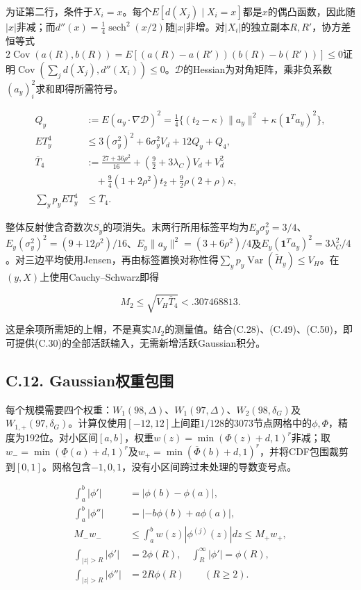 \documentclass[11pt,a4paper]{article}
\begin{document}
为证第二行，条件于\(X_i=x\)。每个\(E[d(X_j)\mid X_i=x]\)都是\(x\)的偶凸函数，因此随\(|x|\)非减；而\(d''(x)=\tfrac14\operatorname{sech}^2(x/2)\)随\(|x|\)非增。对\(|X_i|\)的独立副本\(R,R'\)，协方差恒等式\(2\operatorname{Cov}(a(R),b(R))=E[(a(R)-a(R'))(b(R)-b(R'))]\le0\)证明\(\operatorname{Cov}(\sum_jd(X_j),d''(X_i))\le0\)。\(\mathcal D\)的Hessian为对角矩阵，乘非负系数\((a_y)_i^2\)求和即得所需符号。

\[
\begin{aligned}
Q_y&:=E(a_y\cdot\nabla\mathcal D)^2
=\tfrac14\{(t_2-\kappa)\|a_y\|^2+\kappa(\mathbf1^Ta_y)^2\},\\
ET_y^4&\le3(\sigma_y^2)^2+6\sigma_y^2V_d+12Q_y+Q_4,\\
\overline T_4&:=\frac{27+36\rho^2}{16}
+\left(\frac92+3\lambda_C\right)V_d+V_d^2\\
&\quad+\frac94(1+2\rho^2)t_2+\frac92\rho(2+\rho)\kappa,\\
\sum_yp_yET_y^4&\le\overline T_4.
\end{aligned}
\tag{C.53}
\]

整体反射使含奇数次\(S_y\)的项消失。末两行所用标签平均为\(E_y\sigma_y^2=3/4\)、\(E_y(\sigma_y^2)^2=(9+12\rho^2)/16\)、\(E_y\|a_y\|^2=(3+6\rho^2)/4\)及\(E_y(\mathbf1^Ta_y)^2=3\lambda_C^2/4\)。对三边平均使用Jensen，再由标签置换对称性得\(\sum_yp_y\operatorname{Var}(\widetilde H_y)\le V_H\)。在\((y,X)\)上使用Cauchy--Schwarz即得

\[
M_2\le\sqrt{V_H\overline T_4}<.307468813.
\tag{C.54}
\]

这是余项所需矩的上帽，不是真实\(M_2\)的测量值。结合(C.28)、(C.49)、(C.50)，即可提供(C.30)的全部活跃输入，无需新增活跃Gaussian积分。

\subsection*{C.12.
Gaussian权重包围}\label{c.12.-gaussianux6743ux91cdux5305ux56f4}

每个规模需要四个权重：\(W_1(98,\Delta)\)、\(W_1(97,\Delta)\)、\(W_2(98,\delta_G)\)及\(W_{1,+}(97,\delta_G)\)。计算仅使用\([-12,12]\)上间距\(1/128\)的3073节点网格中的\(\phi,\Phi\)，精度为192位。对小区间\([a,b]\)，权重\(w(z)=\min(\Phi(z)+d,1)^r\)非减；取\(w_- =\min(\underline\Phi(a)+d,1)^r\)及\(w_+=\min(\overline\Phi(b)+d,1)^r\)，并将CDF包围裁剪到\([0,1]\)。网格包含\(-1,0,1\)，没有小区间跨过未处理的导数变号点。

\[
\begin{aligned}
\int_a^b|\phi'|&=|\phi(b)-\phi(a)|,\\
\int_a^b|\phi''|&=|-b\phi(b)+a\phi(a)|,\\
M_-w_-&\le\int_a^bw(z)|\phi^{(j)}(z)|dz\le M_+w_+,\\
\int_{|z|>R}|\phi'|&=2\phi(R),\quad \int_R^\infty|\phi'|=\phi(R),\\
\int_{|z|>R}|\phi''|&=2R\phi(R)\qquad(R\ge2).
\end{aligned}
\tag{C.55}
\]
\end{document}

